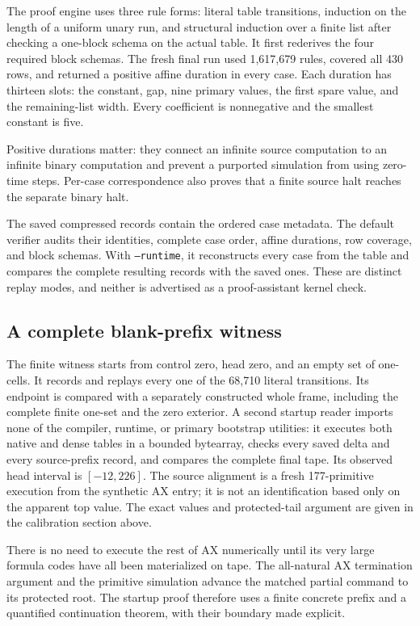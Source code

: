 \documentclass[10pt,a4paper]{article}
\begin{document}
The proof engine uses three rule forms: literal table transitions, induction
on the length of a uniform unary run, and structural induction over a finite
list after checking a one-block schema on the actual table.  It first
rederives the four required block schemas.  The fresh final run used
1,617,679 rules, covered all 430 rows, and returned a positive affine
duration in every case.  Each duration has thirteen slots: the constant,
gap, nine primary values, the first spare value, and the remaining-list
width.  Every coefficient is nonnegative and the smallest constant is five.

Positive durations matter: they connect an infinite source computation to
an infinite binary computation and prevent a purported simulation from
using zero-time steps.  Per-case correspondence also proves that a finite
source halt reaches the separate binary halt.

The saved compressed records contain the ordered case metadata.  The default
verifier audits their identities, complete case order, affine durations, row
coverage, and block schemas.  With \texttt{--runtime}, it reconstructs every
case from the table and compares the complete resulting records with the
saved ones.  These are distinct replay modes, and neither is advertised as
a proof-assistant kernel check.

\subsection{A complete blank-prefix witness}

The finite witness starts from control zero, head zero, and an empty set of
one-cells.  It records and replays every one of the 68,710 literal
transitions.  Its endpoint is compared with a separately constructed whole
frame, including the complete finite one-set and the zero exterior.
A second startup reader imports none of the compiler, runtime, or primary
bootstrap utilities: it executes both native and dense tables in a bounded
bytearray, checks every saved delta and every source-prefix record, and
compares the complete final tape.  Its observed head interval is $[-12,226]$.
The source alignment is a fresh 177-primitive execution from the synthetic
AX entry; it is not an identification based only on the apparent top value.
The exact values and protected-tail argument are given in the calibration
section above.

There is no need to execute the rest of AX numerically until its very large
formula codes have all been materialized on tape.  The all-natural AX
termination argument and the primitive simulation advance the matched
partial command to its protected root.  The startup proof therefore uses a
finite concrete prefix and a quantified continuation theorem, with their
boundary made explicit.
\end{document}
